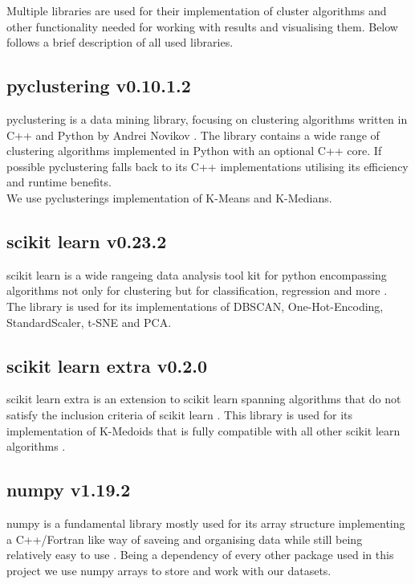 Multiple libraries are used for their implementation of cluster algorithms and other functionality needed for working with results and visualising them. Below follows a brief description of all used libraries.

\subsection[pyclustering]{pyclustering v0.10.1.2}

pyclustering is a data mining library, focusing on clustering algorithms written in C++ and Python by Andrei Novikov \cite{Novikov2019}. The library contains a wide range of clustering algorithms implemented in Python with an optional C++ core. If possible pyclustering falls back to its C++ implementations utilising its efficiency and runtime benefits.\\
We use pyclusterings implementation of K-Means and K-Medians.

\subsection[scikit learn]{scikit learn v0.23.2}
scikit learn is a wide rangeing data analysis tool kit for python encompassing algorithms not only for clustering but for classification, regression and more \cite{scikitlearn}.\\
The library is used for its implementations of DBSCAN, One-Hot-Encoding, StandardScaler, t-SNE and PCA.

\subsection[scikit learn extra]{scikit learn extra v0.2.0}
scikit learn extra is an extension to scikit learn spanning algorithms that do not satisfy the inclusion criteria of scikit learn \cite{scikit-learn-extra}. This library is used for its implementation of K-Medoids that is fully compatible with all other scikit learn algorithms .

\subsection[numpy]{numpy v1.19.2}
numpy is a fundamental library mostly used for its array structure implementing a C++/Fortran like way of saveing and organising data while still being relatively easy to use \cite{numpy}. Being a dependency of every other package used in this project we use numpy arrays to store and work with our datasets.

